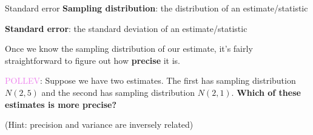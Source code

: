 \documentclass[10pt,t]{beamer}
\begin{document}
\begin{frame}{Standard error}
\textbf{Sampling distribution}: the distribution of an estimate/statistic
\medskip

\textbf{Standard error}: the standard deviation of an estimate/statistic

\vspace{0.3cm} 

Once we know the sampling distribution of our estimate, it's fairly straightforward to figure out how \textbf{precise} it is. 

\vspace{0.3cm}

\textcolor{violet}{POLLEV}: Suppose we have two estimates. The first has sampling distribution $N(2, 5)$ and the second has sampling distribution $N(2, 1)$. \textbf{Which of these estimates is more precise?}

\vspace{0.3cm}

(Hint: precision and variance are inversely related) 


\end{frame}

%	
%	
%	
%	
%	
%	
%	
%	
%	
\end{document}
